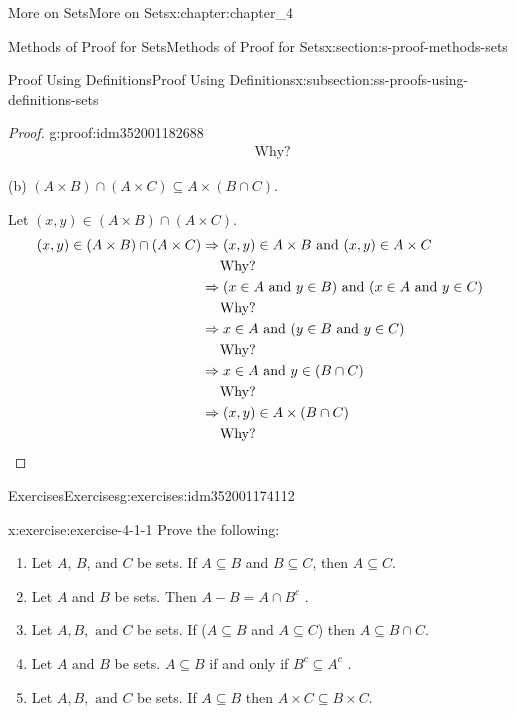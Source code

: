 \documentclass[oneside,10pt,]{book}
\newcommand{\qedhere}{\relax}
\begin{document}
\begin{chapterptx}{More on Sets}{}{More on Sets}{}{}{x:chapter:chapter_4}
\begin{sectionptx}{Methods of Proof for Sets}{}{Methods of Proof for Sets}{}{}{x:section:s-proof-methods-sets}
\begin{subsectionptx}{Proof Using Definitions}{}{Proof Using Definitions}{}{}{x:subsection:ss-proofs-using-definitions-sets}
\begin{proof}{}{g:proof:idm352001182688}
\begin{equation*}
\begin{split}
&\quad \textrm{ Why? }
\end{split}
\end{equation*}
%
\par
(b) \((A\times  B)\cap (A\times C)\subseteq A\times ( B\cap C)\).%
\par
Let \((x, y) \in  (A\times  B) \cap  (A\times C)\).%
\begin{equation*}
\begin{split}
(x, y) \in  (A\times  B)\cap (A\times C) &\Rightarrow (x, y) \in  A\times  B\textrm{ and } (x, y) \in  A\times C\\
&\quad \textrm{ Why? }\\
&\Rightarrow (x \in  A \textrm{ and } y \in  B) \textrm{ and } (x \in  A \textrm{ and } y \in  C)\\
&\quad \textrm{ Why? }\\
&\Rightarrow  x \in  A \textrm{ and } (y \in  B\textrm{ and } y \in  C)\\
&\quad \textrm{ Why? }\\
&\Rightarrow  x \in  A\textrm{ and } y \in  (B\cap  C)\\
&\quad \textrm{ Why? }\\
&\Rightarrow (x, y) \in  A \times (B\cap  C)\\
&\quad \textrm{ Why? } 
\end{split}\qedhere
\end{equation*}
%
\end{proof}
\end{subsectionptx}
%
%
\typeout{************************************************}
\typeout{************************************************}
%
\begin{exercises-subsection}{Exercises}{}{Exercises}{}{}{g:exercises:idm352001174112}
\begin{divisionexercise}{1}{}{}{x:exercise:exercise-4-1-1}%
Prove the following:%
\begin{enumerate}[label=(\alph*)]
\item{}Let \(A\), \(B\), and \(C\) be sets. If \(A\subseteq B\) and \(B\subseteq C\), then \(A\subseteq C\).%
\item{}Let \(A\) and \(B\) be sets. Then \(A - B= A\cap B^c\) .%
\item{}Let \(A,B, \textrm{ and } C\) be sets. If (\(A\subseteq B\) and \(A\subseteq C\)) then \(A\subseteq B\cap C\).%
\item{}Let \(A \textrm{ and } B\) be sets. \(A\subseteq B\) if and only if \(B^c\subseteq A^c\) .%
\item{}Let \(A,B, \textrm{ and } C\) be sets. If \(A\subseteq B\) then \(A\times C \subseteq B\times C\).%

\end{enumerate}
\end{divisionexercise}
\end{exercises-subsection}
\end{sectionptx}
\end{chapterptx}
\end{document}
